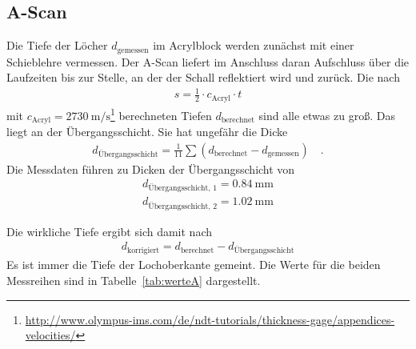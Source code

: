 \subsection{A-Scan\label{sec:AScan}}
Die Tiefe der Löcher $d_\text{gemessen}$ im Acrylblock werden zunächst mit einer Schieblehre vermessen. Der A-Scan liefert im Anschluss daran Aufschluss über die Laufzeiten bis zur Stelle, an der der Schall reflektiert wird und zurück. Die nach 
\begin{align}
	s = \frac{1}{2} \cdot c_\text{Acryl} \cdot t
\end{align} mit $c_\text{Acryl} = \SI{2730}{\meter\per\second}$\footnote{\url{http://www.olympus-ims.com/de/ndt-tutorials/thickness-gage/appendices-velocities/}} berechneten Tiefen $d_\text{berechnet}$ sind alle etwas zu groß. Das liegt an der Übergangsschicht. Sie hat ungefähr die Dicke
\begin{align}
	d_\text{Übergangsschicht} = \frac{1}{11} \sum (d_\text{berechnet}-d_\text{gemessen}) \quad .
\end{align}
Die Messdaten führen zu Dicken der Übergangsschicht von
\begin{align}
	d_\text{Übergangsschicht, 1} = \SI{0.84}{\milli\meter} \\
	d_\text{Übergangsschicht, 2} = \SI{1.02}{\milli\meter}
\end{align}

	
Die wirkliche Tiefe ergibt sich damit nach
\begin{align}
	d_\text{korrigiert} =d_ \text{berechnet} - d_\text{Übergangsschicht}
\end{align}
Es ist immer die Tiefe der Lochoberkante gemeint. Die Werte für die beiden Messreihen sind in Tabelle~\ref{tab:werteA} dargestellt.


\clearpage
 
